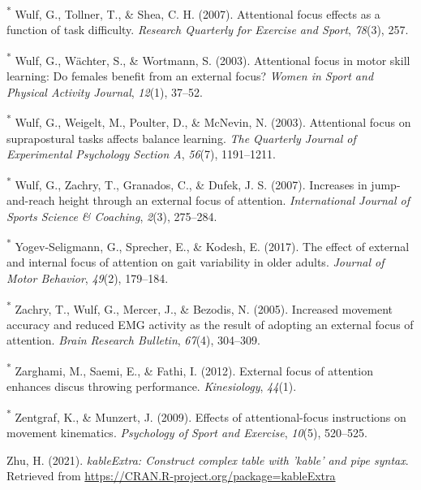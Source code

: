 \documentclass[
  man, donotrepeattitle,floatsintext]{apa7}
\newlength{\cslhangindent}
\newlength{\cslentryspacingunit} %
\newenvironment{CSLReferences}[2] %
 {%
  \setlength{\parindent}{0pt}
  \ifodd #1
  \let\oldpar\par
  \def\par{\hangindent=\cslhangindent\oldpar}
  \fi
  \setlength{\parskip}{#2\cslentryspacingunit}
 }%
 {}
\begin{document}
\begin{CSLReferences}{1}{0}
\leavevmode{}%
\textsuperscript{*} Wulf, G., Tollner, T., \& Shea, C. H. (2007). Attentional focus effects as a function of task difficulty. \emph{Research Quarterly for Exercise and Sport}, \emph{78}(3), 257.

\leavevmode{}%
\textsuperscript{*} Wulf, G., Wächter, S., \& Wortmann, S. (2003). Attentional focus in motor skill learning: Do females benefit from an external focus? \emph{Women in Sport and Physical Activity Journal}, \emph{12}(1), 37--52.

\leavevmode{}%
\textsuperscript{*} Wulf, G., Weigelt, M., Poulter, D., \& McNevin, N. (2003). Attentional focus on suprapostural tasks affects balance learning. \emph{The Quarterly Journal of Experimental Psychology Section A}, \emph{56}(7), 1191--1211.

\leavevmode{}%
\textsuperscript{*} Wulf, G., Zachry, T., Granados, C., \& Dufek, J. S. (2007). Increases in jump-and-reach height through an external focus of attention. \emph{International Journal of Sports Science \& Coaching}, \emph{2}(3), 275--284.

\leavevmode{}%
\textsuperscript{*} Yogev-Seligmann, G., Sprecher, E., \& Kodesh, E. (2017). The effect of external and internal focus of attention on gait variability in older adults. \emph{Journal of Motor Behavior}, \emph{49}(2), 179--184.

\leavevmode{}%
\textsuperscript{*} Zachry, T., Wulf, G., Mercer, J., \& Bezodis, N. (2005). Increased movement accuracy and reduced EMG activity as the result of adopting an external focus of attention. \emph{Brain Research Bulletin}, \emph{67}(4), 304--309.

\leavevmode{}%
\textsuperscript{*} Zarghami, M., Saemi, E., \& Fathi, I. (2012). External focus of attention enhances discus throwing performance. \emph{Kinesiology}, \emph{44}(1).

\leavevmode{}%
\textsuperscript{*} Zentgraf, K., \& Munzert, J. (2009). Effects of attentional-focus instructions on movement kinematics. \emph{Psychology of Sport and Exercise}, \emph{10}(5), 520--525.

\leavevmode{}%
Zhu, H. (2021). \emph{kableExtra: Construct complex table with 'kable' and pipe syntax}. Retrieved from \url{https://CRAN.R-project.org/package=kableExtra}


\end{CSLReferences}
\end{document}
